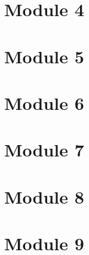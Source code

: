 \documentclass[a4paper,10pt]{report}
\theoremstyle{remark}
\begin{document}
\chapter{Module 4}
	

\chapter{Module 5}
	

\chapter{Module 6}
	

\chapter{Module 7}
	

\chapter{Module 8}
	

\chapter{Module 9}
	
\end{document}
